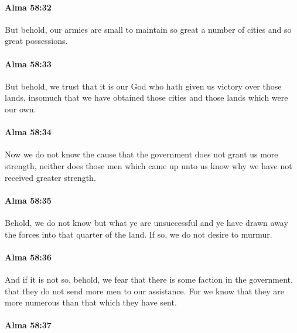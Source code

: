 		\paragraph{Alma 58:32} %
			\label{ALMA-58-32}

			But behold, our armies are small
			to maintain so great a number of cities and so great possessions.

		\paragraph{Alma 58:33} %
			\label{ALMA-58-33}

			But behold, we trust that it is our God
			who hath given us victory over those lands,
			insomuch that we have obtained those cities and those lands which were our own.

		\paragraph{Alma 58:34} %
			\label{ALMA-58-34}

			Now we do not know the cause
			that the government does not grant us more strength,
			neither does those men which came up unto us know
			why we have not received greater strength.

		\paragraph{Alma 58:35} %
			\label{ALMA-58-35}

			Behold, we do not know but what ye are unsuccessful
			and ye have drawn away the forces into that quarter of the land.
			If so, we do not desire to murmur.

		\paragraph{Alma 58:36} %
			\label{ALMA-58-36}

			And if it is not so,
			behold, we fear that there is some faction in the government,
			that they do not send more men to our assistance.
			For we know that they are more numerous than that which they have sent.

		\paragraph{Alma 58:37} %
			\label{ALMA-58-37}

